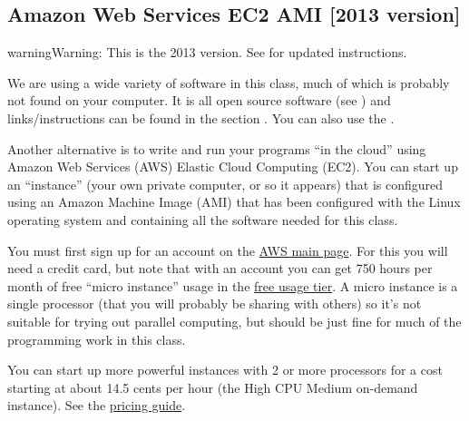 \documentclass[letterpaper,10pt,english]{sphinxmanual}
\begin{document}
\subsection{Amazon Web Services EC2 AMI {[}2013 version{]}}
\label{2013/aws:aws}\label{2013/aws::doc}\label{2013/aws:amazon-web-services-ec2-ami-2013-version}
\begin{notice}{warning}{Warning:}
This is the 2013 version.  See  for updated instructions.
\end{notice}

We are using a wide variety of software in this class, much of which is
probably not found on your computer.  It is all open source software (see
) and links/instructions
can be found in the section {\hyperref[software_installation:software\string-installation]{}}.
You can also use the {\hyperref[vm:vm]{}}.

Another alternative is to write and run your programs ``in the cloud''
using Amazon Web Services (AWS) Elastic Cloud Computing (EC2).
You can start up an ``instance'' (your own private computer, or so it appears)
that is configured using an Amazon Machine Image (AMI) that has been
configured with the Linux operating system and containing
all the software needed for this class.

You must first sign up for an account  on the \href{http://aws.amazon.com/}{AWS main page}.  For this you will need a credit
card, but note that with an account you can get 750 hours per month of
free ``micro instance'' usage in the
\href{http://aws.amazon.com/free/}{free usage tier}.
A micro instance is a single processor (that you will probably be sharing
with others) so it's not suitable for trying out parallel computing, but
should be just fine for much of the programming work in this class.

You can start up more powerful instances with 2 or more processors for a cost
starting at about 14.5 cents per hour (the High CPU Medium on-demand
instance).  See the \href{http://aws.amazon.com/ec2/\#pricing}{pricing guide}.
\end{document}
